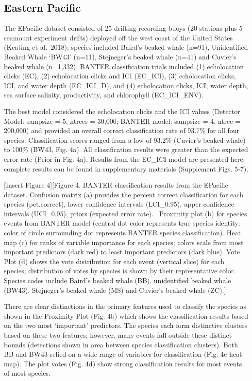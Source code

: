 \documentclass[
  authoryear,
  preprint,
  3p]{elsarticle}
\begin{document}
\hypertarget{eastern-pacific}{%
\subsection{Eastern Pacific}\label{eastern-pacific}}

The EPacific dataset consisted of 25 drifting recording buoys (20
stations plus 5 seamount experiment drifts) deployed off the west coast
of the United States (Keating et al.~2018); species included Baird's
beaked whale (n=91), Unidentified Beaked Whale `BW43' (n=11),
Stejneger's beaked whale (n=41) and Cuvier's beaked whale (n=1,332).
BANTER classification trials included (1) echolocation clicks (EC), (2)
echolocation clicks and ICI (EC\_ICI), (3) echolocation clicks, ICI, and
water depth (EC\_ICI\_D), and (4) echolocation clicks, ICI, water depth,
sea surface salinity, productivity, and chlorophyll (EC\_ICI\_ENV).

The best model considered the echolocation clicks and the ICI values
(Detector Model: sampsize = 5, ntrees = 30,000; BANTER model: sampsize =
4, ntree = 200,000) and provided an overall correct classification rate
of 93.7\% for all four species. Classification scores ranged from a low
of 93.2\% (Cuvier's beaked whale) to 100\% (BW43, Fig. 4a). All
classification results were greater than the expected error rate (Prior
in Fig. 4a). Results from the EC\_ICI model are presented here; complete
results can be found in supplementary materials (Supplement Figs. 5-7).

{[}Insert Figure 4{]}{[}Figure 4. BANTER classification results from the
EPacific dataset. Confusion matrix (a) provides the percent correct
classification for each species (pct.correct), lower confidence
intervals (LCI\_0.95), upper confidence intervals (UCI\_0.95), priors
(expected error rate).~ Proximity plot (b) for species events from
BANTER model (central dot color represents true species identity; color
of circle surrounding dot represents BANTER species classification).
Heat map (c) for ranks of variable importance for each species; colors
scale from most important predictors (dark red) to least important
predictors (dark blue). Vote Plot (d) shows the vote distribution for
each event (vertical slice) for each species; distribution of votes by
species is shown by their representative color. Species codes include
Baird's beaked whale (BB), unidentified beaked whale (BW43), Stejneger's
beaked whale (MS) and Cuvier's beaked whale (ZC).{]}

There are clear distinctions in the primary features used to classify
the species as shown in the Proximity Plot (Fig. 4b) which shows the
classification results based on the two most `important' predictors. The
species each form distinctive clusters based on these two features;
however, many events fall outside these distinct bounds (detections
shown in area between species classification clusters). Both BB and BW43
relied on a wide range of variables for classification (Fig. 4c heat
map). The plot votes (Fig. 4d) show strong classification results for
most events of most species.
\end{document}
